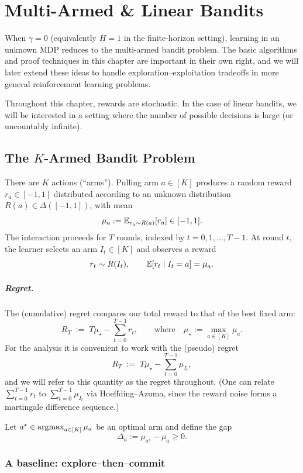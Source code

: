 \chapter{Multi-Armed \& Linear Bandits}
\label{chap:bandits}

When $\gamma=0$ (equivalently $H=1$ in the finite-horizon setting), learning in an
unknown MDP reduces to the multi-armed bandit problem. The basic algorithms and
proof techniques in this chapter are important in their own right, and we will
later extend these ideas to handle exploration--exploitation tradeoffs in more
general reinforcement learning problems.

Throughout this chapter, rewards are stochastic. In the case of linear
bandits, we will be interested in a setting where the number of
possible decisions is large (or uncountably infinite).

\section{The $K$-Armed Bandit Problem}

There are $K$ actions (``arms''). Pulling arm $a\in[K]$ produces a random reward
$r_a\in[-1,1]$ distributed according to an unknown distribution
$R(a)\in\Delta([-1,1])$, with mean
\[
\mu_a := \mathbb{E}_{r_a\sim R(a)}[r_a]\in[-1,1].
\]
The interaction proceeds for $T$ rounds, indexed by $t=0,1,\dots,T-1$. At round
$t$, the learner selects an arm $I_t\in[K]$ and observes a reward
\[
r_t \sim R(I_t),\qquad \mathbb{E}[r_t\mid I_t=a]=\mu_a.
\]

\paragraph{Regret.}
The (cumulative) regret compares our total reward to that of the best fixed arm:
\[
R_T \;:=\; T\mu_\star - \sum_{t=0}^{T-1} r_t,
\qquad \text{where}\quad
\mu_\star := \max_{a\in[K]}\mu_a.
\]
For the analysis it is convenient to work with the (pseudo) regret
\[
R_T \;:=\; T\mu_\star - \sum_{t=0}^{T-1}\mu_{I_t},
\]
and we will refer to this quantity as the regret throughout.
(One can relate $\sum_{t=0}^{T-1} r_t$ to $\sum_{t=0}^{T-1}\mu_{I_t}$ via
Hoeffding--Azuma, since the reward noise forms a martingale difference sequence.)

Let $a^\star\in\operatorname*{argmax}_{a\in[K]}\mu_a$ be an optimal arm and define the gap
\[
\Delta_a := \mu_{a^\star}-\mu_a \ge 0.
\]


\subsection{A baseline: explore--then--commit}

